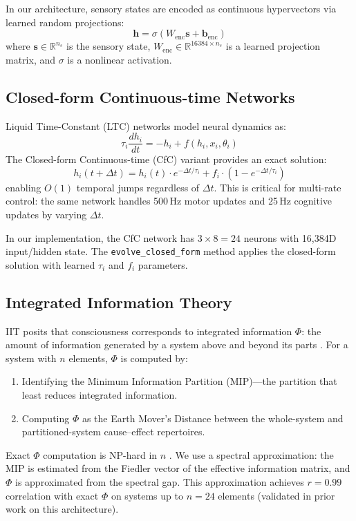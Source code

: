 \documentclass[11pt,a4paper]{article}
\begin{document}
In our architecture, sensory states are encoded as continuous hypervectors via learned random projections:
\[
\mathbf{h} = \sigma(W_{\mathrm{enc}} \mathbf{s} + \mathbf{b}_{\mathrm{enc}})
\]
where $\mathbf{s} \in \mathbb{R}^{n_s}$ is the sensory state, $W_{\mathrm{enc}} \in \mathbb{R}^{16384 \times n_s}$ is a learned projection matrix, and $\sigma$ is a nonlinear activation.

\subsection{Closed-form Continuous-time Networks}

Liquid Time-Constant (LTC) networks \citep{hasani2021liquid} model neural dynamics as:
\[
\tau_i \frac{dh_i}{dt} = -h_i + f(h_i, x_i, \theta_i)
\]
The Closed-form Continuous-time (CfC) variant provides an exact solution:
\[
h_i(t + \Delta t) = h_i(t) \cdot e^{-\Delta t / \tau_i} + f_i \cdot (1 - e^{-\Delta t / \tau_i})
\]
enabling $O(1)$ temporal jumps regardless of $\Delta t$.
This is critical for multi-rate control: the same network handles 500\,Hz motor updates and 25\,Hz cognitive updates by varying $\Delta t$.

In our implementation, the CfC network has $3 \times 8 = 24$ neurons with 16,384D input/hidden state.
The \texttt{evolve\_closed\_form} method applies the closed-form solution with learned $\tau_i$ and $f_i$ parameters.

\subsection{Integrated Information Theory}

IIT posits that consciousness corresponds to integrated information $\Phi$: the amount of information generated by a system above and beyond its parts \citep{tononi2004information, oizumi2014phenomenology}.
For a system with $n$ elements, $\Phi$ is computed by:
\begin{enumerate}
  \item Identifying the Minimum Information Partition (MIP)---the partition that least reduces integrated information.
  \item Computing $\Phi$ as the Earth Mover's Distance between the whole-system and partitioned-system cause--effect repertoires.
\end{enumerate}

Exact $\Phi$ computation is NP-hard in $n$ \citep{tegmark2016improved}.
We use a spectral approximation: the MIP is estimated from the Fiedler vector of the effective information matrix, and $\Phi$ is approximated from the spectral gap.
This approximation achieves $r = 0.99$ correlation with exact $\Phi$ on systems up to $n = 24$ elements (validated in prior work on this architecture).
\end{document}
